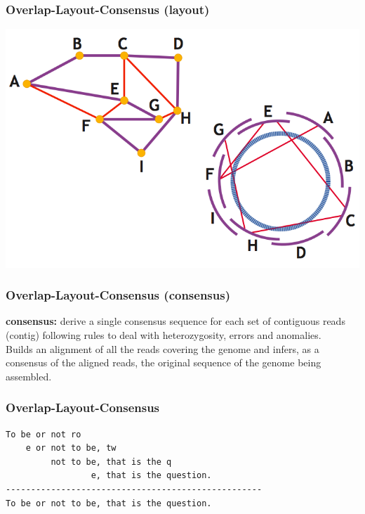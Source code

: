 \documentclass[pdf]{beamer}
\begin{document}
\begin{frame}
\frametitle{Overlap-Layout-Consensus (layout)}
\begin{center}
\includegraphics[scale=0.35]{Figures/layout.png}
\end{center}
\end{frame}

\begin{frame}
\frametitle{Overlap-Layout-Consensus (consensus)}
\textbf{consensus:}
derive a single consensus sequence for each set of contiguous reads (contig) following rules to deal with heterozygosity, errors and anomalies.\\
\vspace{0.2in}
Builds an alignment of all the reads covering the genome and infers, as a consensus of the aligned reads, the original sequence of the genome being assembled.
\end{frame}

\begin{frame}[fragile]
\frametitle{Overlap-Layout-Consensus}
\begin{verbatim}
To be or not ro
    e or not to be, tw
         not to be, that is the q
                 e, that is the question.
---------------------------------------------------
To be or not to be, that is the question.
\end{verbatim}
\end{frame}
\end{document}
